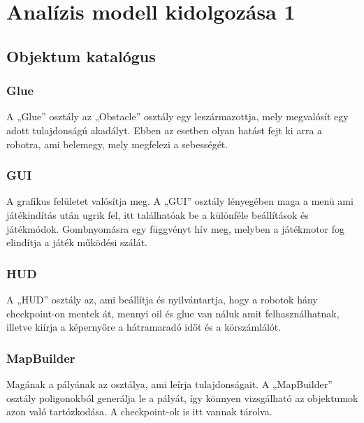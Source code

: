 %
\chapter{Analízis modell kidolgozása 1}

\thispagestyle{fancy}

\section{Objektum katalógus}


\subsection{Glue}
A „Glue” osztály az „Obstacle” osztály egy leszármazottja, mely megvalósít egy adott tulajdonságú akadályt. Ebben az esetben olyan hatást fejt ki arra a robotra, ami belemegy, mely megfelezi a sebességét.
\subsection{GUI}
A grafikus felületet valósítja meg. A „GUI” osztály lényegében maga a menü ami játékindítás után ugrik fel, itt találhatóak be a különféle beállítások és játékmódok. Gombnyomásra egy függvényt hív meg, melyben a játékmotor fog elindítja a játék működési szálát.
\subsection{HUD}
A „HUD” osztály az, ami beállítja és nyilvántartja, hogy a robotok hány checkpoint-on mentek át, mennyi oil és glue van náluk amit felhasználhatnak, illetve kiírja a képernyőre a hátramaradó időt és a körszámlálót.
\subsection{MapBuilder}
Magának a pályának az osztálya, ami leírja tulajdonságait. A „MapBuilder” osztály poligonokból generálja le a pályát, így könnyen vizsgálható az objektumok azon való tartózkodása. A checkpoint-ok is itt vannak tárolva.
